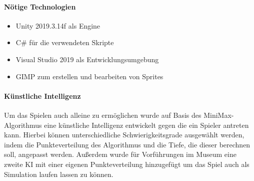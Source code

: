 \paragraph{Nötige Technologien}
\begin{itemize}
	\item Unity 2019.3.14f als Engine
	\item C\# für die verwendeten Skripte
	\item Visual Studio 2019 als Entwicklungsumgebung 
	\item GIMP zum erstellen und bearbeiten von Sprites
\end{itemize}

\paragraph{Künstliche Intelligenz}
Um das Spielen auch alleine zu ermöglichen wurde auf Basis des MiniMax-Algorithmus eine künstliche Intelligenz entwickelt gegen die ein Spieler antreten kann. Hierbei können unterschiedliche Schwierigkeitsgrade ausgewählt werden, indem die Punkteverteilung des Algorithmus und die Tiefe, die dieser berechnen soll, angepasst werden. Außerdem wurde für Vorführungen im Museum eine zweite KI mit einer eigenen Punkteverteilung hinzugefügt um das Spiel auch als Simulation laufen lassen zu können.




